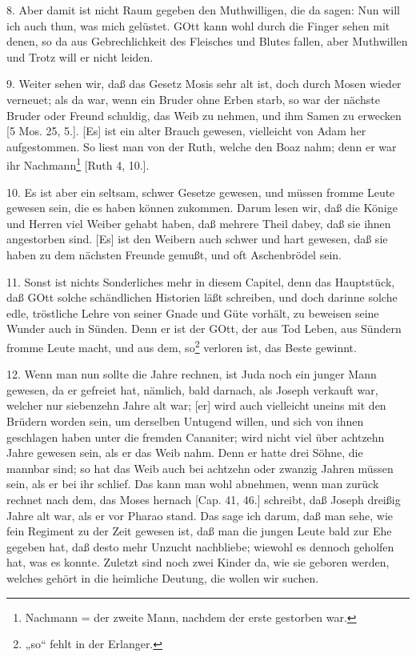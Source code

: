 8. Aber damit ist nicht Raum gegeben den Muthwilligen, die da sagen: Nun will ich auch thun, was mich gelüstet. GOtt kann wohl durch die Finger sehen mit denen, so da aus Gebrechlichkeit des Fleisches und Blutes fallen, aber Muthwillen und Trotz will er nicht leiden.

9. Weiter sehen wir, daß das Gesetz Mosis sehr alt ist, doch durch Mosen wieder verneuet; als da war, wenn ein Bruder ohne Erben starb, so war der nächste Bruder oder Freund schuldig, das Weib zu nehmen, und ihm Samen zu erwecken [5 Mos. 25, 5.]. [Es] ist ein alter Brauch gewesen, vielleicht von Adam her aufgestommen. So liest man von der Ruth, welche den Boaz nahm; denn er war ihr Nachmann\footnote{Nachmann = der zweite Mann, nachdem der erste gestorben war.} [Ruth 4, 10.].

10. Es ist aber ein seltsam, schwer Gesetze gewesen, und müssen fromme Leute gewesen sein, die es haben können zukommen. Darum lesen wir, daß die Könige und Herren viel Weiber gehabt haben, daß mehrere Theil dabey, daß sie ihnen angestorben sind. [Es] ist den Weibern auch schwer und hart gewesen, daß sie haben zu dem nächsten Freunde gemußt, und oft Aschenbrödel sein.

11. Sonst ist nichts Sonderliches mehr in diesem Capitel, denn das Hauptstück, daß GOtt solche schändlichen Historien läßt schreiben, und doch darinne solche edle, tröstliche Lehre von seiner Gnade und Güte vorhält, zu beweisen seine Wunder auch in Sünden. Denn er ist der GOtt, der aus Tod Leben, aus Sündern fromme Leute macht, und aus dem, so\footnote{„so“ fehlt in der Erlanger.} verloren ist, das Beste gewinnt.

12. Wenn man nun sollte die Jahre rechnen, ist Juda noch ein junger Mann gewesen, da er gefreiet hat, nämlich, bald darnach, als Joseph verkauft war, welcher nur siebenzehn Jahre alt war; [er] wird auch vielleicht uneins mit den Brüdern worden sein, um derselben Untugend willen, und sich von ihnen geschlagen haben unter die fremden Cananiter; wird nicht viel über achtzehn Jahre gewesen sein, als er das Weib nahm. Denn er hatte drei Söhne, die mannbar sind; so hat das Weib auch bei achtzehn oder zwanzig Jahren müssen sein, als er bei ihr schlief. Das kann man wohl abnehmen, wenn man zurück rechnet nach dem, das Moses hernach [Cap. 41, 46.] schreibt, daß Joseph dreißig Jahre alt war, als er vor Pharao stand. Das sage ich darum, daß man sehe, wie fein Regiment zu der Zeit gewesen ist, daß man die jungen Leute bald zur Ehe gegeben hat, daß desto mehr Unzucht nachbliebe; wiewohl es dennoch geholfen hat, was es konnte. Zuletzt sind noch zwei Kinder da, wie sie geboren werden, welches gehört in die heimliche Deutung, die wollen wir suchen.

